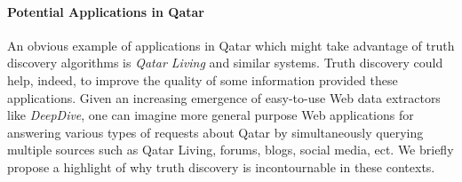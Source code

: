\documentclass[paper=a4, fontsize=10pt]{scrartcl}	%
\numberwithin{equation}{section}															%
\numberwithin{figure}{section}																%
\numberwithin{table}{section}																%
\begin{document}
 \paragraph*{Potential Applications in Qatar}An obvious example of applications in Qatar which might take advantage 
 of truth discovery algorithms is \emph{Qatar Living} and similar systems. Truth discovery
 could help, indeed, to improve the quality of some  information provided these applications.
Given an increasing emergence of easy-to-use Web data extractors like \emph{DeepDive}, one 
can imagine more general purpose Web applications for answering various types of requests about Qatar by simultaneously querying multiple
sources such as Qatar Living, forums, blogs, social media, ect. We briefly propose a highlight of why truth discovery is incontournable in 
these contexts.
 
\end{document}
